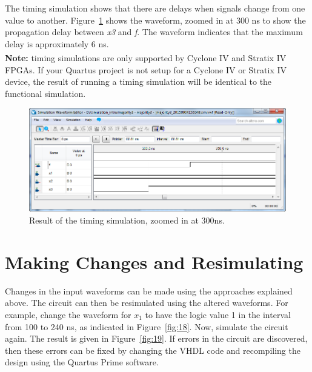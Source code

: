 \documentclass[11pt, twoside, pdftex]{article}
\begin{document}
The timing simulation shows that there are delays when signals change from one value to another. 
Figure~\ref{fig:21} shows the waveform, zoomed in at 300 ns to show the propagation delay 
between {\it x3} and {\it f}. The waveform indicates that the maximum delay is approximately 6 ns. 
~\\

{\bf Note:} timing simulations are only supported by Cyclone\textsuperscript{\textregistered} IV and Stratix\textsuperscript{\textregistered} IV FPGAs.
If your Quartus project is not setup for a Cyclone IV or Stratix IV device, the result of running a timing simulation will be identical to the functional simulation.

\begin{figure}[H]
   \begin{center}
      \includegraphics[scale=0.65]{figures/figure21.png}
   \caption{Result of the timing simulation, zoomed in at 300ns.} 
	 \label{fig:21}
	 \end{center}
\end{figure}

\section{Making Changes and Resimulating}

Changes in the input waveforms can be made using the approaches explained above. The circuit
can then be resimulated using the altered waveforms. For example, change the
waveform for $x_1$ to have the logic value 1 in the interval from 100 to 240 ns, as indicated
in Figure~\ref{fig:18}. Now, simulate the circuit again. The result is 
given in Figure~\ref{fig:19}. If errors in the circuit are discovered, then these errors can be fixed by
changing the VHDL code and recompiling the design using the Quartus Prime software.
~\\
\end{document}
